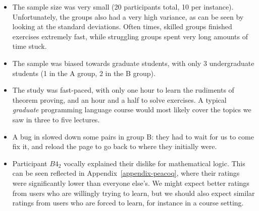 \begin{itemize}

  \item The sample size was very small (20 participants total, 10 per instance).
Unfortunately, the groups also had a very high variance, as can be seen by
looking at the standard deviations.  Often times, skilled groups finished
exercises extremely fast, while struggling groups spent very long amounts of
time stuck.

  \item The sample was biased towards graduate students, with only 3
undergraduate students (1 in the A group, 2 in the B group).

  \item The study was fast-paced, with only one hour to learn the rudiments of
theorem proving, and an hour and a half to solve exercises.  A typical
\emph{graduate} programming language course would most likely cover the topics
we saw in three to five lectures.

  \item A bug in \PeaCoq{} slowed down some pairs in group B: they had to wait
for us to come fix it, and reload the page to go back to where they initially
were.

  \item Participant $B4_{2}$ vocally explained their dislike for mathematical
logic.  This can be seen reflected in Appendix~\ref{appendix-peacoq}, where
their ratings were significantly lower than everyone else's.  We might expect better ratings from users who are willingly trying to learn, but we should also expect similar ratings from users who are forced to learn, for instance in a course setting.

\end{itemize}
